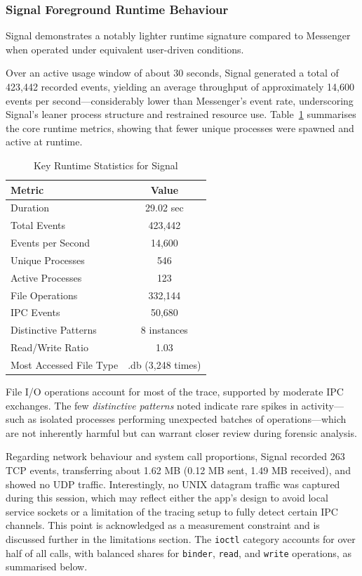 \documentclass[a4paper,12pt]{report}
\begin{document}
\subsubsection{Signal Foreground Runtime Behaviour}

Signal demonstrates a notably lighter runtime signature compared to Messenger when operated under equivalent user-driven conditions.

Over an active usage window of about 30 seconds, Signal generated a total of 423,442 recorded events, yielding an average throughput of approximately 14,600 events per second—considerably lower than Messenger’s event rate, underscoring Signal’s leaner process structure and restrained resource use. Table~\ref{tab:signal_key_stats} summarises the core runtime metrics, showing that fewer unique processes were spawned and active at runtime.

\begin{table}[H]
    \centering
    \caption{Key Runtime Statistics for Signal}
    \label{tab:signal_key_stats}
    \begin{tabular}{|l|c|}
        \hline
        \textbf{Metric} & \textbf{Value} \\
        \hline
        Duration & 29.02 sec \\
        Total Events & 423,442 \\
        Events per Second & 14,600 \\
        Unique Processes & 546 \\
        Active Processes & 123 \\
        File Operations & 332,144 \\
        IPC Events & 50,680 \\
        Distinctive Patterns & 8 instances \\
        Read/Write Ratio & 1.03 \\
        Most Accessed File Type & .db (3,248 times) \\
        \hline
    \end{tabular}
\end{table}

File I/O operations account for most of the trace, supported by moderate IPC exchanges. The few \textit{distinctive patterns} noted indicate rare spikes in activity—such as isolated processes performing unexpected batches of operations—which are not inherently harmful but can warrant closer review during forensic analysis.

Regarding network behaviour and system call proportions, Signal recorded 263 TCP events, transferring about 1.62 MB (0.12 MB sent, 1.49 MB received), and showed no UDP traffic. Interestingly, no UNIX datagram traffic was captured during this session, which may reflect either the app’s design to avoid local service sockets or a limitation of the tracing setup to fully detect certain IPC channels. This point is acknowledged as a measurement constraint and is discussed further in the limitations section. The \texttt{ioctl} category accounts for over half of all calls, with balanced shares for \texttt{binder}, \texttt{read}, and \texttt{write} operations, as summarised below.
\end{document}
